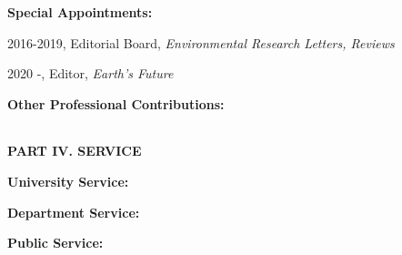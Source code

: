 \documentclass[10pt]{article}
\begin{document}
\vspace{0.25cm}
\textbf{Special Appointments:}

\hspace{0.5cm} 2016-2019, Editorial Board, \textit{Environmental Research Letters, Reviews}

\hspace{0.5cm} 2020 -, Editor, \textit{Earth's Future}



\vspace{0.25cm}
\textbf{Other Professional Contributions:}
\hspace{0.25cm}
\begin{tabular}{lp{2cm}p{12cm}}
\end{tabular}


\vspace{0.25cm}
\textbf{PART IV.  SERVICE}

\vspace{0.5cm}
\textbf{University Service:}
\vspace{0.2cm}


\vspace{0.25cm}
\textbf{Department Service:}
\vspace{0.2cm}


\vspace{1.25cm}
\textbf{Public Service:}
\vspace{0.2cm}

\end{document}
